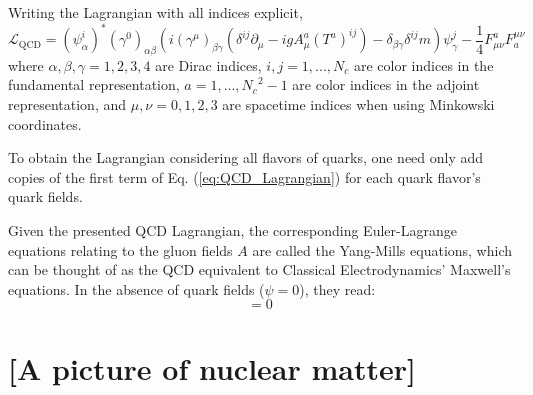 
Writing the Lagrangian with all indices explicit,
\begin{equation}
	\mathcal{L}_{\text{QCD}} = \left(\psi_\alpha^i \right)^*  \left( \gamma^0  \right)_{\alpha \beta} \left(i \left(\gamma^\mu \right)_{\beta \gamma} \left( \delta^{ij} \partial_\mu - i g A^a_\mu \left( T^a \right)^{ij} \right) - \delta_{\beta \gamma} \delta^{ij} m \right) \psi_\gamma^j - \frac{1}{4} F_{\mu \nu}^a F^{\mu \nu}_a
	\label{eq:QCD_Lagrangian_Indices}
\end{equation}
where $\alpha, \beta, \gamma = 1,2,3,4$ are Dirac indices, $i,j=1, ..., N_c$ are color indices in the fundamental representation, $a = 1, ..., {N_c}^2-1$ are color indices in the adjoint representation, and $\mu,\nu = 0,1,2,3$ are spacetime indices when using Minkowski coordinates.

To obtain the Lagrangian considering all flavors of quarks, one need only add copies of the first term of Eq. (\ref{eq:QCD_Lagrangian}) for each quark flavor's quark fields.

Given the presented QCD Lagrangian, the corresponding Euler-Lagrange equations relating to the gluon fields $A$ are called the Yang-Mills equations, which can be thought of as the QCD equivalent to Classical Electrodynamics' Maxwell's equations.
In the absence of quark fields ($\psi=0$), they read:
\begin{equation}
	[D_\mu, F^{\mu \nu}] = 0
	\label{eq:homogenous_Yang-Mills}
\end{equation}

\section{[A picture of nuclear matter]}
\label{sec:nuclear_matter}

